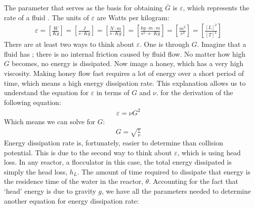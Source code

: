 \documentclass[letterpaper,10pt,english]{sphinxmanual}
\begin{document}
The parameter that serves as the basis for obtaining \(\bar G\) is \(\varepsilon\), which represents the  rate of a fluid . The units of \(\varepsilon\) are Watts per kilogram:
\begin{equation}\label{equation:Flocculation/Floc_Design:Flocculation/Floc_Design:1}
\begin{split}\varepsilon = \left[ \frac{W}{Kg} \right]
= \left[ \frac{J}{s \cdot Kg} \right]
= \left[ \frac{N \cdot m}{s \cdot Kg} \right]
= \left[ \frac{kg \cdot m \cdot m}{s^2 \cdot s \cdot Kg} \right]
= \left[ \frac{m^2}{s^3} \right]
= \left[ \frac{[L]^2}{[T]^3} \right]\end{split}
\end{equation}
There are at least two ways to think about \(\varepsilon\). One is through \(G\). Imagine that a fluid has ; there is no internal friction caused by fluid flow. No matter how high \(G\) becomes, no energy is dissipated. Now image a honey, which has a very high viscosity. Making honey flow fast requires a lot of energy over a short period of time, which means a high energy dissipation rate. This explanation allows us to understand the equation for \(\varepsilon\) in terms of \(G\) and \(\nu\).  for the derivation of the following equation:
\begin{equation}\label{equation:Flocculation/Floc_Design:Flocculation/Floc_Design:2}
\begin{split}\varepsilon = \nu G^2\end{split}
\end{equation}
Which means we can solve for \(G\):
\begin{equation}\label{equation:Flocculation/Floc_Design:Flocculation/Floc_Design:3}
\begin{split}G = \sqrt{\frac{\varepsilon}{\nu}}\end{split}
\end{equation}
Energy dissipation rate is, fortunately, easier to determine than collision potential. This is due to the second way to think about \(\varepsilon\), which is using head loss. In any reactor, a flocculator in this case, the total energy dissipated is simply the head loss, \(h_L\). The amount of time required to dissipate that energy is the residence time of the water in the reactor, \(\theta\). Accounting for the fact that ‘head’ energy is due to gravity \(g\), we have all the parameters needed to determine another equation for energy dissipation rate:
\end{document}
